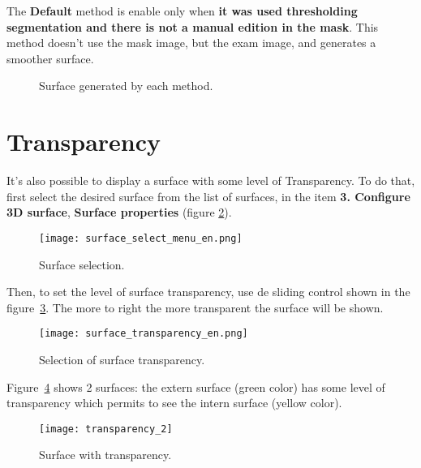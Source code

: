 The \textbf{Default} method is enable only when \textbf{it was used thresholding segmentation and there is not a manual edition in the mask}. This method doesn't use the mask image, but the exam image, and generates a smoother surface.

\begin{figure}[!htb]
  \centering
  \hfill
  \hfill
  \caption{Surface generated by each method.}
  \label{fig:surf_method}
\end{figure}

\section{Transparency}

It's also possible to display a surface with some level of Transparency. To do that, first select the desired surface from the list of surfaces, in the item \textbf{3. Configure 3D surface}, \textbf{Surface properties} (figure \ref{fig:select_surface}).

\begin{figure}[!htb]
\centering
\texttt{[image: surface\_select\_menu\_en.png]}
\caption{Surface selection.}
\label{fig:select_surface}
\end{figure}

Then, to set the level of surface transparency, use de sliding control shown in the figure~\ref{fig:select_transparency}. The more to right the more transparent the surface will be shown.

\begin{figure}[!htb]
\centering
\texttt{[image: surface\_transparency\_en.png]}
\caption{Selection of surface transparency.}
\label{fig:select_transparency}
\end{figure}

Figure~\ref{fig:model_transparency} shows 2 surfaces: the extern surface (green color) has some level of transparency which permits to see the intern surface (yellow color).

\begin{figure}[!htb]
\centering
\texttt{[image: transparency\_2]}
\caption{Surface with transparency.}
\label{fig:model_transparency}
\end{figure}

